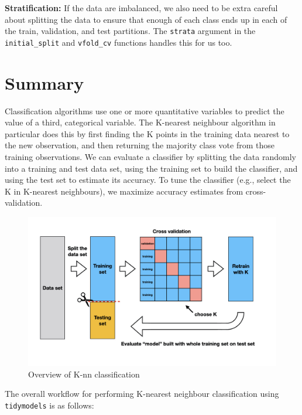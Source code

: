 \documentclass[
]{krantz}
\begin{document}
\textbf{Stratification:} If the data are imbalanced, we also need to be extra
careful about splitting the data to ensure that enough of each class ends up in
each of the train, validation, and test partitions. The \texttt{strata} argument
in the \texttt{initial\_split} and \texttt{vfold\_cv} functions handles this for us too.

\hypertarget{summary}{%
\section{Summary}\label{summary}}

Classification algorithms use one or more quantitative variables to predict the
value of a third, categorical variable. The K-nearest neighbour algorithm in
particular does this by first finding the K points in the training data nearest
to the new observation, and then returning the majority class vote from those
training observations. We can evaluate a classifier by splitting the data
randomly into a training and test data set, using the training set to build the
classifier, and using the test set to estimate its accuracy. To tune the
classifier (e.g., select the K in K-nearest neighbours), we maximize accuracy
estimates from cross-validation.

\begin{figure}
\includegraphics[width=1\linewidth]{img/train-test-overview} \caption{Overview of K-nn classification}\label{fig:06-overview}
\end{figure}

The overall workflow for performing K-nearest neighbour classification using \texttt{tidymodels} is as follows:
\end{document}
